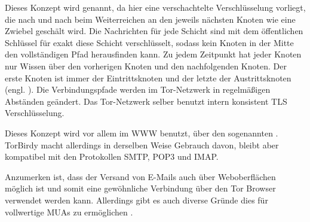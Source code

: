 Dieses Konzept wird  genannt, da hier eine verschachtelte Verschlüsselung vorliegt, die nach und nach beim Weiterreichen an den jeweils nächsten Knoten wie eine Zwiebel geschält wird. Die Nachrichten für jede Schicht sind mit dem öffentlichen Schlüssel für exakt diese Schicht verschlüsselt, sodass kein Knoten in der Mitte den vollständigen Pfad herausfinden kann.
Zu jedem Zeitpunkt hat jeder Knoten nur Wissen über den vorherigen Knoten und den nachfolgenden Knoten. Der erste Knoten ist immer der Eintrittsknoten und der letzte der Austrittsknoten (engl. ). Die Verbindungspfade werden im Tor-Netzwerk in regelmäßigen Abständen geändert. Das Tor-Netzwerk selber benutzt intern konsistent TLS Verschlüsselung.

Dieses Konzept wird vor allem im WWW benutzt, über den sogenannten  .
TorBirdy macht allerdings in derselben Weise Gebrauch davon, bleibt aber kompatibel mit den Protokollen SMTP, POP3 und IMAP.

Anzumerken ist, dass der Versand von E-Mails auch über Weboberflächen möglich ist und somit eine gewöhnliche Verbindung über den Tor Browser verwendet werden kann. Allerdings gibt es auch diverse Gründe dies für vollwertige MUAs zu ermöglichen .

